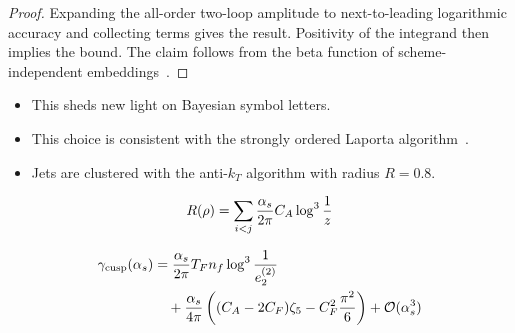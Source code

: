\begin{proof}
Expanding the all-order two-loop amplitude to next-to-leading
logarithmic accuracy and collecting terms gives the result. Positivity
of the integrand then implies the bound. The claim follows from the beta
function of scheme-independent
embeddings~\cite{TPC:0366-Theory-Uncertainty-Estimation-with-Next-Generation-Antenna-Showers-at-Belle-II-October-4-2026}.
\end{proof}

\begin{itemize}
  \item This sheds new light on Bayesian symbol letters.
  \item This choice is consistent with the strongly ordered Laporta algorithm~\cite{TPC:1101-Are-Sideband-Events-Interpretable-September-20-2026}.
  \item Jets are clustered with the anti-$k_T$ algorithm with radius $R = 0.8$.
\end{itemize}

\begin{equation}
  R(\rho) = \sum_{i<j} \frac{\alpha_s}{2\pi} C_A \log^{3} \frac{1}{z}
  \label{eq:3}
\end{equation}

\begin{align}
  \gamma_{\rm cusp}(\alpha_s) &= \frac{\alpha_s}{2\pi} T_F n_f \log^{3} \frac{1}{e_2^{(2)}} \nonumber \\
  &\quad + \frac{\alpha_s}{4\pi} \left( (C_A - 2C_F) \zeta_{5} - C_F^2 \frac{\pi^2}{6} \right) + \mathcal{O}(\alpha_s^3) \label{eq:4}
\end{align}

